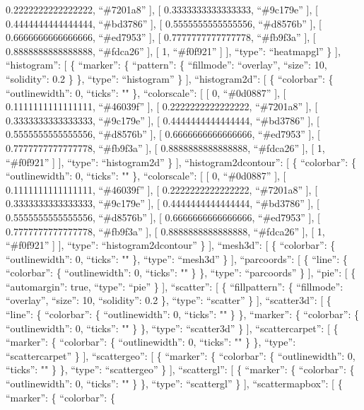 \documentclass[
]{article}
\begin{document}
0.2222222222222222, ``\#7201a8'' {]}, {[} 0.3333333333333333,
``\#9c179e'' {]}, {[} 0.4444444444444444, ``\#bd3786'' {]}, {[}
0.5555555555555556, ``\#d8576b'' {]}, {[} 0.6666666666666666,
``\#ed7953'' {]}, {[} 0.7777777777777778, ``\#fb9f3a'' {]}, {[}
0.8888888888888888, ``\#fdca26'' {]}, {[} 1, ``\#f0f921'' {]} {]},
``type'': ``heatmapgl'' \} {]}, ``histogram'': {[} \{ ``marker'': \{
``pattern'': \{ ``fillmode'': ``overlay'', ``size'': 10, ``solidity'':
0.2 \} \}, ``type'': ``histogram'' \} {]}, ``histogram2d'': {[} \{
``colorbar'': \{ ``outlinewidth'': 0, ``ticks'': "" \}, ``colorscale'':
{[} {[} 0, ``\#0d0887'' {]}, {[} 0.1111111111111111, ``\#46039f'' {]},
{[} 0.2222222222222222, ``\#7201a8'' {]}, {[} 0.3333333333333333,
``\#9c179e'' {]}, {[} 0.4444444444444444, ``\#bd3786'' {]}, {[}
0.5555555555555556, ``\#d8576b'' {]}, {[} 0.6666666666666666,
``\#ed7953'' {]}, {[} 0.7777777777777778, ``\#fb9f3a'' {]}, {[}
0.8888888888888888, ``\#fdca26'' {]}, {[} 1, ``\#f0f921'' {]} {]},
``type'': ``histogram2d'' \} {]}, ``histogram2dcontour'': {[} \{
``colorbar'': \{ ``outlinewidth'': 0, ``ticks'': "" \}, ``colorscale'':
{[} {[} 0, ``\#0d0887'' {]}, {[} 0.1111111111111111, ``\#46039f'' {]},
{[} 0.2222222222222222, ``\#7201a8'' {]}, {[} 0.3333333333333333,
``\#9c179e'' {]}, {[} 0.4444444444444444, ``\#bd3786'' {]}, {[}
0.5555555555555556, ``\#d8576b'' {]}, {[} 0.6666666666666666,
``\#ed7953'' {]}, {[} 0.7777777777777778, ``\#fb9f3a'' {]}, {[}
0.8888888888888888, ``\#fdca26'' {]}, {[} 1, ``\#f0f921'' {]} {]},
``type'': ``histogram2dcontour'' \} {]}, ``mesh3d'': {[} \{
``colorbar'': \{ ``outlinewidth'': 0, ``ticks'': "" \}, ``type'':
``mesh3d'' \} {]}, ``parcoords'': {[} \{ ``line'': \{ ``colorbar'': \{
``outlinewidth'': 0, ``ticks'': "" \} \}, ``type'': ``parcoords'' \}
{]}, ``pie'': {[} \{ ``automargin'': true, ``type'': ``pie'' \} {]},
``scatter'': {[} \{ ``fillpattern'': \{ ``fillmode'': ``overlay'',
``size'': 10, ``solidity'': 0.2 \}, ``type'': ``scatter'' \} {]},
``scatter3d'': {[} \{ ``line'': \{ ``colorbar'': \{ ``outlinewidth'': 0,
``ticks'': "" \} \}, ``marker'': \{ ``colorbar'': \{ ``outlinewidth'':
0, ``ticks'': "" \} \}, ``type'': ``scatter3d'' \} {]},
``scattercarpet'': {[} \{ ``marker'': \{ ``colorbar'': \{
``outlinewidth'': 0, ``ticks'': "" \} \}, ``type'': ``scattercarpet'' \}
{]}, ``scattergeo'': {[} \{ ``marker'': \{ ``colorbar'': \{
``outlinewidth'': 0, ``ticks'': "" \} \}, ``type'': ``scattergeo'' \}
{]}, ``scattergl'': {[} \{ ``marker'': \{ ``colorbar'': \{
``outlinewidth'': 0, ``ticks'': "" \} \}, ``type'': ``scattergl'' \}
{]}, ``scattermapbox'': {[} \{ ``marker'': \{ ``colorbar'': \{
\end{document}
